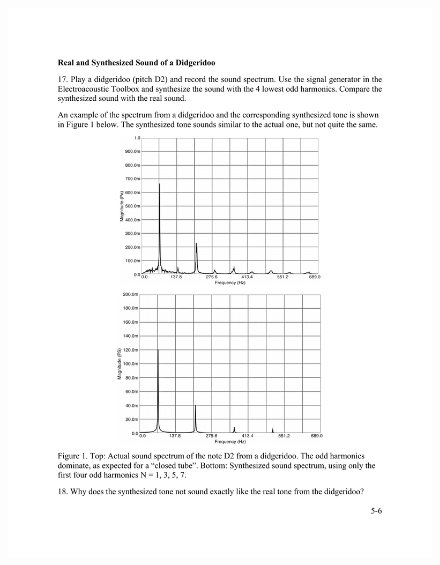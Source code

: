 \documentclass[11pt]{NSF}
\begin{document}
%
\begin{figure}[hbtp]
\begin{center}
\includegraphics[width=.7\textwidth]{fig5_1}
\caption{}
\label{f:} 
\end{center} 
\end{figure}
%
\end{document}

